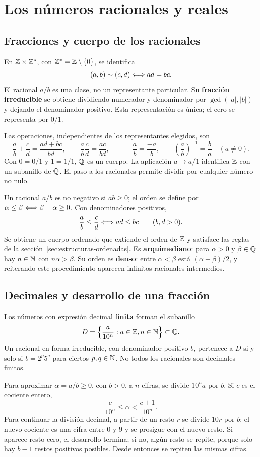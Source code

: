 \chapter{Los números racionales y reales}
\label{cap:racionales-reales}

\section{Fracciones y cuerpo de los racionales}
\label{sec:racionales}
En $\mathbb{Z}\times\mathbb{Z}^*$, con $\mathbb{Z}^*=\mathbb{Z}\setminus\{0\}$, se identifica
\[
 (a,b)\sim(c,d)\Longleftrightarrow ad=bc.
\]
El racional $a/b$ es una clase, no un representante particular.
Su \textbf{fracción irreducible} se obtiene dividiendo numerador y
denominador por $\gcd(|a|,|b|)$ y dejando el denominador positivo.
Esta representación es única; el cero se representa por $0/1$.

Las operaciones, independientes de los representantes elegidos, son
\[
 \frac ab+\frac cd=\frac{ad+bc}{bd},\qquad
 \frac ab\frac cd=\frac{ac}{bd},\qquad
 -\frac ab=\frac{-a}{b},\qquad
 \left(\frac ab\right)^{-1}=\frac ba\quad(a\ne0).
\]
Con $0=0/1$ y $1=1/1$, $\mathbb{Q}$ es un cuerpo.
La aplicación $a\mapsto a/1$ identifica $\mathbb{Z}$ con un subanillo de $\mathbb{Q}$.
El paso a los racionales permite dividir por cualquier número no nulo.

Un racional $a/b$ es no negativo si $ab\ge0$; el orden se define por
$\alpha\le\beta\Longleftrightarrow\beta-\alpha\ge0$. Con denominadores positivos,
\[
 \frac ab\le\frac cd\Longleftrightarrow ad\le bc\qquad(b,d>0).
\]
Se obtiene un cuerpo ordenado que extiende el orden de $\mathbb{Z}$ y satisface
las reglas de la sección~\ref{sec:estructuras-ordenadas}.
Es \textbf{arquimediano}: para $\alpha>0$ y $\beta\in\mathbb{Q}$ hay
$n\in\mathbb{N}$ con $n\alpha>\beta$.
Su orden es \textbf{denso}: entre $\alpha<\beta$ está
$(\alpha+\beta)/2$, y reiterando este procedimiento aparecen infinitos
racionales intermedios.

\section{Decimales y desarrollo de una fracción}
\label{sec:decimales-racionales}
Los números con expresión decimal \textbf{finita} forman el subanillo
\[
 D=\left\{\frac a{10^n}:a\in\mathbb{Z}, n\in\mathbb{N}\right\}\subset\mathbb{Q}.
\]
Un racional en forma irreducible, con denominador positivo $b$, pertenece
a $D$ si y solo si $b=2^p5^q$ para ciertos $p,q\in\mathbb{N}$.
No todos los racionales son decimales finitos.

Para aproximar $\alpha=a/b\ge0$, con $b>0$, a $n$ cifras, se divide
$10^na$ por $b$. Si $c$ es el cociente entero,
\[
 \frac c{10^n}\le\alpha<\frac{c+1}{10^n}.
\]
Para continuar la división decimal, a partir de un resto $r$ se divide
$10r$ por $b$: el nuevo cociente es una cifra entre $0$ y $9$ y se
prosigue con el nuevo resto. Si aparece resto cero, el desarrollo termina;
si no, algún resto se repite, porque solo hay $b-1$ restos positivos
posibles. Desde entonces se repiten las mismas cifras.

